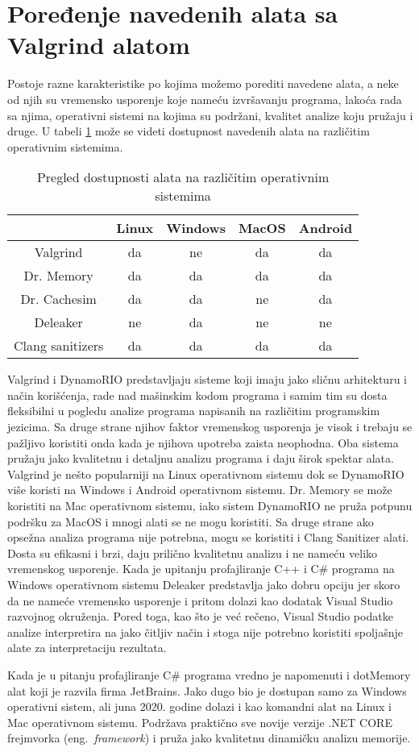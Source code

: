 \documentclass[a4paper]{article}
\begin{document}
\section{Poređenje navedenih alata sa Valgrind alatom}
Postoje razne karakteristike po kojima možemo porediti navedene alata, a neke od njih su vremensko usporenje koje nameću izvršavanju programa, lakoća rada sa njima, operativni sistemi na kojima su podržani, kvalitet analize koju pružaju i druge. U tabeli \ref{tab:tabela1} može se videti dostupnost navedenih alata na različitim operativnim sistemima. 
\begin{table}[h!]
\begin{center}
\caption{Pregled dostupnosti alata na različitim operativnim sistemima}
\begin{tabular}{|c|c|c|c|c|} \hline
& Linux & Windows & MacOS & Android\\ \hline
Valgrind & da & ne & da & da \\ \hline
Dr. Memory & da & da & da & da\\ \hline
Dr. Cachesim & da & da & ne & da\\ \hline
Deleaker & ne & da & ne & ne\\ \hline
Clang sanitizers & da & da & da & da\\ \hline
\end{tabular}
\label{tab:tabela1}
\end{center}
\end{table}
Valgrind i DynamoRIO predstavljaju sisteme koji imaju jako sličnu arhitekturu i način korišćenja, rade nad mašinskim kodom programa i samim tim su dosta fleksibilni u pogledu analize programa napisanih na različitim programskim jezicima. Sa druge strane njihov faktor vremenskog usporenja je visok i trebaju se pažljivo koristiti onda kada je njihova upotreba zaista neophodna. Oba sistema pružaju jako kvalitetnu i detaljnu analizu programa i daju širok spektar alata. Valgrind je nešto popularniji na Linux operativnom sistemu dok se DynamoRIO više koristi na Windows i Android operativnom sistemu. Dr. Memory se može koristiti na Mac operativnom sistemu, iako sistem DynamoRIO ne pruža potpunu podršku za MacOS i mnogi alati se ne mogu koristiti. Sa druge strane ako opsežna analiza programa nije potrebna, mogu se koristiti i Clang Sanitizer alati. Dosta su efikasni i brzi, daju prilično kvalitetnu analizu i ne nameću veliko vremenskog usporenje. Kada je upitanju profajliranje C++ i C\# programa na Windows operativnom sistemu Deleaker predstavlja jako dobru opciju jer skoro da ne nameće vremensko usporenje i pritom dolazi kao dodatak Visual Studio razvojnog okruženja. Pored toga, kao što je već rečeno, Visual Studio podatke analize interpretira na jako čitljiv način i stoga nije potrebno koristiti spoljašnje alate za interpretaciju rezultata. \par
Kada je u pitanju profajliranje C\# programa vredno je napomenuti i dotMemory alat koji je razvila firma JetBrains. Jako dugo bio je dostupan samo za Windows operativni sistem, ali juna 2020. godine dolazi i kao komandni alat na Linux i Mac operativnom sistemu. Podržava praktično sve novije verzije .NET CORE frejmvorka (eng.~{\em framework}) i pruža jako kvalitetnu dinamičku analizu memorije.
\end{document}
